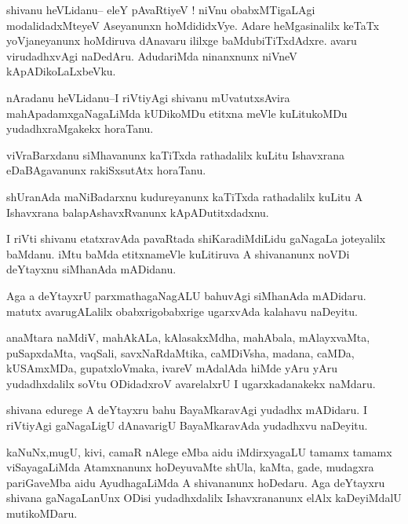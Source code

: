 \documentclass{article}
\begin{document}
\begin{mn}%
shivanu heVLidanu-- eleY pAvaRtiyeV ! niVnu obabxMTigaLAgi modalidadxMteyeV Aseyanunxn 
hoMdididxVye. Adare heMgasinalilx keTaTx yoVjaneyanunx hoMdiruva dAnavaru ililxge 
baMdubiTiTxdAdxre. avaru virudadhxvAgi naDedAru. AdudariMda ninanxnunx niVneV 
kApADikoLaLxbeVku.
\end{mn}

\begin{mn}%
nAradanu heVLidanu--I riVtiyAgi shivanu mUvatutxsAvira mahApadamxgaNagaLiMda kUDikoMDu 
etitxna meVle kuLitukoMDu yudadhxraMgakekx horaTanu.
\end{mn}

\begin{mn}%
viVraBarxdanu siMhavanunx kaTiTxda rathadalilx kuLitu Ishavxrana eDaBAgavanunx rakiSxsutAtx 
horaTanu.
\end{mn}

\begin{mn}%
shUranAda maNiBadarxnu kudureyanunx kaTiTxda rathadalilx kuLitu A Ishavxrana 
balapAshavxRvanunx kApADutitxdadxnu.
\end{mn}

\begin{mn}%
I riVti shivanu etatxravAda pavaRtada shiKaradiMdiLidu gaNagaLa joteyalilx baMdanu. iMtu 
baMda etitxnameVle kuLitiruva A shivananunx noVDi deYtayxnu siMhanAda mADidanu.
\end{mn}

\begin{mn}%
Aga a deYtayxrU parxmathagaNagALU bahuvAgi siMhanAda mADidaru. matutx avarugALalilx 
obabxrigobabxrige ugarxvAda kalahavu naDeyitu.
\end{mn}

\begin{mn}%
anaMtara naMdiV, mahAkALa, kAlasakxMdha, mahAbala, mAlayxvaMta, puSapxdaMta, vaqSali, 
savxNaRdaMtika, caMDiVsha, madana, caMDa, kUSAmxMDa, gupatxloVmaka, ivareV mAdalAda hiMde 
yAru yAru yudadhxdalilx soVtu ODidadxroV avarelalxrU I ugarxkadanakekx naMdaru.
\end{mn}

\begin{mn}%
shivana edurege A deYtayxru bahu BayaMkaravAgi yudadhx mADidaru. I riVtiyAgi gaNagaLigU 
dAnavarigU BayaMkaravAda yudadhxvu naDeyitu.
\end{mn}

\begin{mn}%
kaNuNx,mugU, kivi, camaR nAlege eMba aidu iMdirxyagaLU tamamx tamamx viSayagaLiMda 
Atamxnanunx hoDeyuvaMte shUla, kaMta, gade, mudagxra pariGaveMba aidu AyudhagaLiMda A 
shivananunx hoDedaru. Aga deYtayxru shivana gaNagaLanUnx ODisi yudadhxdalilx Ishavxrananunx 
elAlx kaDeyiMdalU mutikoMDaru.
\end{mn}
\end{document}
